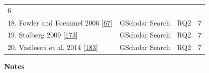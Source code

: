 \documentclass[]{book}
\begin{document}
\begin{longtable}[]{@{}llll@{}}
\begin{minipage}[t]{0.06\columnwidth}
6\strut
\end{minipage}\tabularnewline
\begin{minipage}[t]{0.48\columnwidth}\raggedright\strut
18. Fowler and Foemmel 2006
{[}\protect\hyperlink{ref-fowler2006continuous}{67}{]}\strut
\end{minipage} & \begin{minipage}[t]{0.20\columnwidth}\raggedright\strut
GScholar Search\strut
\end{minipage} & \begin{minipage}[t]{0.14\columnwidth}\raggedright\strut
RQ2\strut
\end{minipage} & \begin{minipage}[t]{0.06\columnwidth}\raggedright\strut
7\strut
\end{minipage}\tabularnewline
\begin{minipage}[t]{0.48\columnwidth}\raggedright\strut
19. Stolberg 2009
{[}\protect\hyperlink{ref-stolberg2009enabling}{173}{]}\strut
\end{minipage} & \begin{minipage}[t]{0.20\columnwidth}\raggedright\strut
GScholar Search\strut
\end{minipage} & \begin{minipage}[t]{0.14\columnwidth}\raggedright\strut
RQ2\strut
\end{minipage} & \begin{minipage}[t]{0.06\columnwidth}\raggedright\strut
7\strut
\end{minipage}\tabularnewline
\begin{minipage}[t]{0.48\columnwidth}\raggedright\strut
20. Vasilescu et al. 2014
{[}\protect\hyperlink{ref-vasilescu2014continuous}{183}{]}\strut
\end{minipage} & \begin{minipage}[t]{0.20\columnwidth}\raggedright\strut
GScholar Search\strut
\end{minipage} & \begin{minipage}[t]{0.14\columnwidth}\raggedright\strut
RQ2\strut
\end{minipage} & \begin{minipage}[t]{0.06\columnwidth}\raggedright\strut
7\strut
\end{minipage}\tabularnewline
\bottomrule
\end{longtable}

\textbf{Notes}
\end{document}
